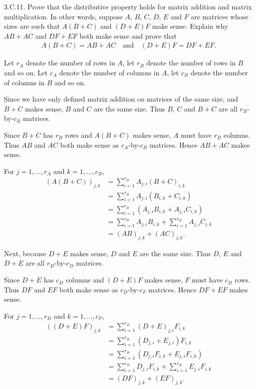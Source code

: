 \documentclass[a5paper]{article}
\begin{document}
\newcommand   \C           {\mathbf{C}}
\newcommand   \R           {\mathbf{R}}
\renewcommand \L           {\mathcal{L}}
\newcommand   \F           {\mathbf{F}}
\renewcommand \P           {\mathcal{P}}
\newcommand   \M           {\mathcal{M}}
\newcommand   \op          {\operatorname}


    3.C.11.
    Prove that the distributive property holds for matrix addition and matrix multiplication.
    In other words, suppose $A$, $B$, $C$, $D$, $E$ and $F$ are matrices whose sizes are such that $A(B+C)$ and $(D+E)F$ make sense.
    Explain why $AB+AC$ and $DF+EF$ both make sense and prove that
\begin{align*}
        A(B+C) = AB+AC  \quad\text{and}\quad  (D+E)F = DF+EF .
\end{align*}

    Let $r_A$ denote the number of rows in $A$, let $r_B$ denote the number of rows in $B$ and so on.
    Let $c_A$ denote the number of columns in $A$, let $c_B$ denote the number of columns in $B$ and so on.

    Since we have only defined matrix addition on matrices of the same size, and $B+C$ makes sense, $B$ and $C$ are the same size.
    Thus $B$, $C$ and $B+C$ are all $r_B$-by-$c_B$ matrices.

    Since $B+C$ has $r_B$ rows and $A(B+C)$ makes sense, $A$ must have $r_B$ columns.
    Thus $AB$ and $AC$ both make sense as $r_A$-by-$c_B$ matrices.
    Hence $AB+AC$ makes sense.

    For $j=1,\dots,r_A$ and $k=1,\dots,c_B$,
\begin{align*}
        (A(B+C))_{j,k} &= \sum_{i=1}^{r_B} A_{j,i} (B+C)_{i,k} \\
                       &= \sum_{i=1}^{r_B} A_{j,i} (B_{i,k} + C_{i,k}) \\
                       &= \sum_{i=1}^{r_B} (A_{j,i}B_{i,k} + A_{j,i}C_{i,k}) \\
                       &= \sum_{i=1}^{r_B} A_{j,i}B_{i,k} + \sum_{i=1}^{r_B} A_{j,i}C_{i,k} \\
                       &= (AB)_{j,k} + (AC)_{j,k} .
\end{align*}

    Next, because $D+E$ makes sense, $D$ and $E$ are the same size.
    Thus $D$, $E$ and $D+E$ are all $r_D$-by-$c_D$ matrices.

    Since $D+E$ has $c_D$ columns and $(D+E)F$ makes sense, $F$ must have $c_D$ rows.
    Thus $DF$ and $EF$ both make sense as $r_D$-by-$c_F$ matrices.
    Hence $DF+EF$ makes sense.

    For $j=1,\dots,r_D$ and $k=1,\dots,c_F$,
\begin{align*}
        ((D+E)F)_{j,k} &= \sum_{i=1}^{r_B} (D+E)_{j,i} F_{i,k} \\
                       &= \sum_{i=1}^{r_B} (D_{j,i}+E_{j,i}) F_{i,k} \\
                       &= \sum_{i=1}^{r_B} (D_{j,i}F_{i,k} +E_{j,i} F_{i,k}) \\
                       &= \sum_{i=1}^{r_B} D_{j,i}F_{i,k} +\sum_{i=1}^{r_B}E_{j,i} F_{i,k} \\
                       &= (DF)_{j,k} + (EF)_{j,k} .
\end{align*}
\end{document}
